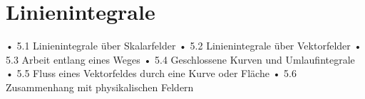 \chapter{Linienintegrale}


	•	5.1 Linienintegrale über Skalarfelder
•	5.2 Linienintegrale über Vektorfelder
•	5.3 Arbeit entlang eines Weges
•	5.4 Geschlossene Kurven und Umlaufintegrale
•	5.5 Fluss eines Vektorfeldes durch eine Kurve oder Fläche
•	5.6 Zusammenhang mit physikalischen Feldern